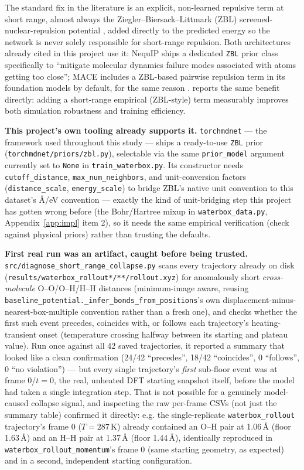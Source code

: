 \documentclass[11pt]{article}
\begin{document}
The standard fix in the literature is an explicit, non-learned repulsive
term at short range, almost always the Ziegler--Biersack--Littmark (ZBL)
screened-nuclear-repulsion potential \citep{zbl1985}, added directly to the
predicted energy so the network is never solely responsible for short-range
repulsion. Both architectures already cited in this project use it: NequIP
ships a dedicated \texttt{ZBL} prior class specifically to ``mitigate
molecular dynamics failure modes associated with atoms getting too close'';
MACE includes a ZBL-based pairwise repulsion term in its foundation models by
default, for the same reason \cite{nequip, mace}. \citet{shortrangeprior2025}
reports the same benefit directly: adding a short-range empirical (ZBL-style)
term measurably improves both simulation robustness and training efficiency.

\textbf{This project's own tooling already supports it.} \texttt{torchmdnet}
--- the framework used throughout this study --- ships a ready-to-use
\texttt{ZBL} prior (\texttt{torchmdnet/priors/zbl.py}), selectable via the
same \texttt{prior\_model} argument currently set to \texttt{None} in
\texttt{train\_waterbox.py}. Its constructor needs \texttt{cutoff\_distance},
\texttt{max\_num\_neighbors}, and unit-conversion factors
(\texttt{distance\_scale}, \texttt{energy\_scale}) to bridge ZBL's native
unit convention to this dataset's \AA/eV convention --- exactly the kind of
unit-bridging step this project has gotten wrong before (the Bohr/Hartree
mixup in \texttt{waterbox\_data.py}, Appendix~\ref{app:impl} item 2), so it
needs the same empirical verification (check against physical priors) rather
than trusting the defaults.

\textbf{First real run was an artifact, caught before being trusted.}
\texttt{src/diagnose\_short\_range\_collapse.py} scans every trajectory
already on disk (\texttt{results/waterbox\_rollout*/**/rollout.xyz}) for
anomalously short \emph{cross-molecule} O--O/O--H/H--H distances
(minimum-image aware, reusing
\texttt{baseline\_potential.\_infer\_bonds\_from\_positions}'s own
displacement-minus-nearest-box-multiple convention rather than a fresh one),
and checks whether the first such event precedes, coincides with, or follows
each trajectory's heating-transient onset (temperature crossing halfway
between its starting and plateau value). Run once against all 42 saved
trajectories, it reported a summary that looked like a clean confirmation
(24/42 ``precedes'', 18/42 ``coincides'', 0 ``follows'', 0 ``no
violation'') --- but every single trajectory's \emph{first} sub-floor event
was at frame 0/$t{=}0$, the real, unheated DFT starting snapshot itself,
before the model had taken a single integration step. That is not possible
for a genuinely model-caused collapse signal, and inspecting the raw
per-frame CSVs (not just the summary table) confirmed it directly: e.g. the
single-replicate \texttt{waterbox\_rollout} trajectory's frame 0
($T{=}287$\,K) already contained an O--H pair at 1.06\,\AA{} (floor
1.63\,\AA) and an H--H pair at 1.37\,\AA{} (floor 1.44\,\AA), identically
reproduced in \texttt{waterbox\_rollout\_momentum}'s frame 0 (same starting
geometry, as expected) and in a second, independent starting configuration.
\end{document}

